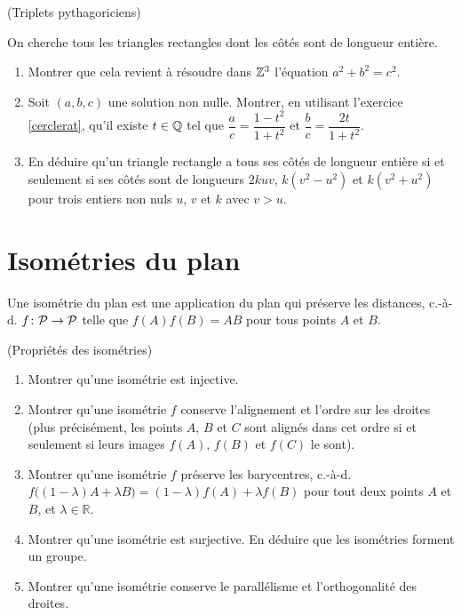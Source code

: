 \documentclass[a4paper,11pt,reqno]{amsart}
\begin{document}
\begin{exo} (Triplets pythagoriciens)

  On cherche tous les triangles rectangles dont les côtés sont de longueur entière.
  \begin{enumerate}
    \item Montrer que cela revient à résoudre dans $\mathbb{Z}^3$ l'équation $a^2+b^2=c^2$.
    \item Soit $(a,b,c)$ une solution non nulle. Montrer, en utilisant l'exercice \ref{cerclerat}, qu'il existe $t \in \mathbb{Q}$ tel que $\dfrac{a}{c}= \dfrac{1-t^2}{1+t^2}$\; et\; $\dfrac{b}{c}= \dfrac{2t}{1+t^2}$.
    \item En déduire qu'un triangle rectangle a tous ses côtés de longueur entière si et seulement si ses côtés sont de longueurs $2kuv$, $k(v^2-u^2)$ et $k(v^2+u^2)$ pour trois entiers non nuls $u$, $v$ et $k$ avec $v>u$.
  \end{enumerate}
\end{exo}


\section{Isométries du plan}

\begin{convention}
  Une isométrie du plan est une application du plan qui préserve les distances, c.-à-d. $f \colon \mathcal{P} \to \mathcal{P}$ telle que $f(A)f(B)=AB$ pour tous points $A$ et $B$.
\end{convention}

\begin{exo} (Propriétés des isométries)

\begin{enumerate}
  \item Montrer qu'une isométrie est injective.
  \item Montrer qu'une isométrie $f$ conserve l'alignement et l'ordre sur les droites (plus précisément, les points $A$, $B$ et $C$ sont alignés dans cet ordre si et seulement si leurs images $f(A)$, $f(B)$ et $f(C)$ le sont).
  \item Montrer qu'une isométrie $f$ préserve les barycentres, c.-à-d. $f\big((1- \lambda )A + \lambda B\big) = (1- \lambda )f(A) + \lambda f(B)$ pour tout deux points $A$ et $B$, et $\lambda \in \mathbb{R}$.
  \item Montrer qu'une isométrie est surjective. En déduire que les isométries forment un groupe.
  \item Montrer qu'une isométrie conserve le parallélisme et l'orthogonalité des droites.
\end{enumerate}
\end{exo}
\end{document}

